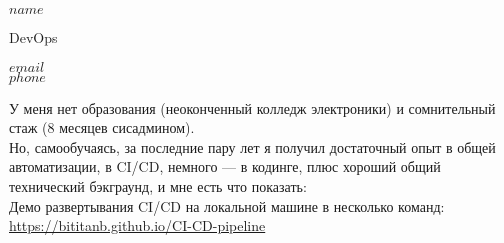 \documentclass[$fontsize$, a4paper]{article}
\begin{document}
\begin{spacing}{0.3}
{\LARGE $name$}\\
\end{spacing}


{\setlength\multicolsep{0pt}%
\begin{multicols}{2}





\begin{spacing}{0.7}
  {\large DevOps}\hspace{1.55cm}{25 лет}\\
\end{spacing}

\columnbreak

\begin{flushright}
    \href{mailto:$email$}{$email$}\\
    $phone$\\
\end{flushright}

\end{multicols}
}

\vspace{30pt}

У меня нет образования (неоконченный колледж электроники) и сомнительный стаж (8 месяцев сисадмином).\\
Но, самообучаясь, за последние пару лет я получил достаточный опыт в общей автоматизации, в CI/CD, немного — в кодинге, плюс хороший общий технический бэкграунд, и мне есть что показать:\\

Демо развертывания CI/CD на локальной машине в несколько команд:\\
\url{https://bititanb.github.io/CI-CD-pipeline}\\
\hspace*{\fill}{\small Kubernetes/Docker, Ansible, Jenkins, Zabbix, ELK, Vagrant}\\
\end{document}
